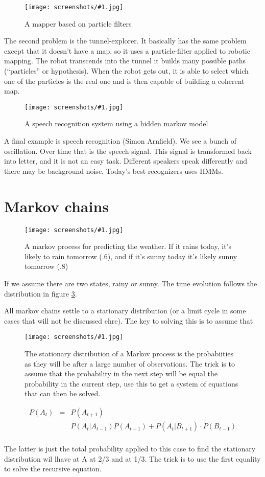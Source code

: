 \documentclass[a4, 12pt, english, USenglish]{scrreprt}
\newcommand{\screenshot}[2]{
\begin{figure}[htb]
\texttt{[image: screenshots/\#1.jpg]}
\label{#1}
\caption{#2}
\end{figure}}
\begin{document}
\screenshot{particlefiltermapper}{A mapper based on particle filters}

The second problem is the tunnel-explorer. It basically has the same
problem except that it doesn't have a map, so it uses a
particle-filter applied to robotic mapping.  The robot transcends into
the tunnel it builds many possible paths (``particles'' or
hypothesis). When the robot gets out, it is able to select which one
of the particles is the real one and is then capable of building a
coherent map.


\screenshot{speechmarkov}{A speech recognition system using a hidden
  markov model}

A final example is speech recognition (Simon Arnfield).  We see a
bunch of oscillation.   Over time that is the speech signal.   This
signal is transformed back into letter, and it is not an easy task.
Different speakers speak differently and there may be background
noise.   Today's best recognizers uses HMMs.


\section{Markov chains}

\screenshot{weathermarkov}{A markov process for predicting the
  weather.   If it rains today, it's likely to rain tomorrow (.6), and
if it's sunny today it's likely sunny tomorrow (.8)}

If we assume there are two states, rainy or sunny.   The time
evolution follows the distribution in figure \ref{weathermarkov}.

All markov chains settle to a stationary distribution (or a limit
cycle in some cases that will not be discussed ehre).  The key to
solving this is to assume that 

\screenshot{stationarydistribution}{The stationary distribution of a
  Markov process is the probabiities as they will be after a large
  number of observations.  The trick is to assume that the probability
in the next step will be equal the probability in the current step,
use this to get a system of equations that can then be solved.}

\[
\begin{array}{lcl}
    P(A_t) &=& P(A_{t+1}) \\
   && P(A_t | A_{t-1}) P(A_{t-1}) + P(A_t | B_{t+1}) \cdot   P(B_{t-1})\\
\end{array}
\]

The latter is just the total probability applied to this case to find
the stationary distribution wil lhave at A at 2/3 and at 1/3.   The
trick is to use the first equality to solve the recursive equation.
\end{document}
